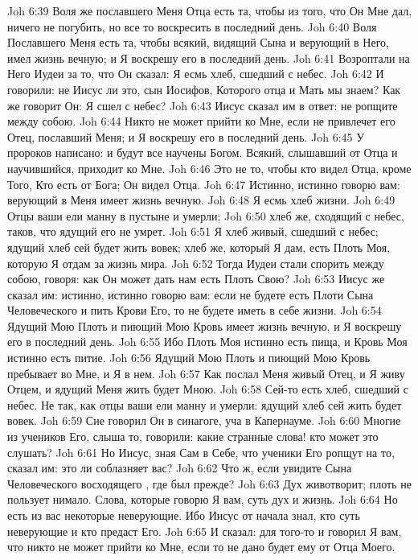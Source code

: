 \vs Joh 6:39 Воля же пославшего Меня Отца есть та, чтобы из того, что Он Мне дал, ничего не погубить, но все то воскресить в последний день.
\vs Joh 6:40 Воля Пославшего Меня есть та, чтобы всякий, видящий Сына и верующий в Него, имел жизнь вечную; и Я воскрешу его в последний день.
\vs Joh 6:41 Возроптали на Него Иудеи за то, что Он сказал: Я есмь хлеб, сшедший с небес.
\vs Joh 6:42 И говорили: не Иисус ли это, сын Иосифов, Которого отца и Мать мы знаем? Как же говорит Он: Я сшел с небес?
\vs Joh 6:43 Иисус сказал им в ответ: не ропщите между собою.
\vs Joh 6:44 Никто не может прийти ко Мне, если не привлечет его Отец, пославший Меня; и Я воскрешу его в последний день.
\vs Joh 6:45 У пророков написано: и будут все научены Богом. Всякий, слышавший от Отца и научившийся, приходит ко Мне.
\vs Joh 6:46 Это не то, чтобы кто видел Отца, кроме Того, Кто есть от Бога; Он видел Отца.
\vs Joh 6:47 Истинно, истинно говорю вам: верующий в Меня имеет жизнь вечную.
\vs Joh 6:48 Я есмь хлеб жизни.
\vs Joh 6:49 Отцы ваши ели манну в пустыне и умерли;
\vs Joh 6:50 хлеб же, сходящий с небес, таков, что ядущий его не умрет.
\vs Joh 6:51 Я хлеб живый, сшедший с небес; ядущий хлеб сей будет жить вовек; хлеб же, который Я дам, есть Плоть Моя, которую Я отдам за жизнь мира.
\vs Joh 6:52 Тогда Иудеи стали спорить между собою, говоря: как Он может дать нам есть Плоть Свою?
\vs Joh 6:53 Иисус же сказал им: истинно, истинно говорю вам: если не будете есть Плоти Сына Человеческого и пить Крови Его, то не будете иметь в себе жизни.
\vs Joh 6:54 Ядущий Мою Плоть и пиющий Мою Кровь имеет жизнь вечную, и Я воскрешу его в последний день.
\vs Joh 6:55 Ибо Плоть Моя истинно есть пища, и Кровь Моя истинно есть питие.
\vs Joh 6:56 Ядущий Мою Плоть и пиющий Мою Кровь пребывает во Мне, и Я в нем.
\vs Joh 6:57 Как послал Меня живый Отец, и Я живу Отцем,  и ядущий Меня жить будет Мною.
\vs Joh 6:58 Сей-то есть хлеб, сшедший с небес. Не так, как отцы ваши ели манну и умерли: ядущий хлеб сей жить будет вовек.
\vs Joh 6:59 Сие говорил Он в синагоге, уча в Капернауме.
\vs Joh 6:60 Многие из учеников Его, слыша то, говорили: какие странные слова! кто может это слушать?
\vs Joh 6:61 Но Иисус, зная Сам в Себе, что ученики Его ропщут на то, сказал им: это ли соблазняет вас?
\vs Joh 6:62 Что ж, если увидите Сына Человеческого восходящего , где был прежде?
\vs Joh 6:63 Дух животворит; плоть не пользует нимало. Слова, которые говорю Я вам, суть дух и жизнь.
\vs Joh 6:64 Но есть из вас некоторые неверующие. Ибо Иисус от начала знал, кто суть неверующие и кто предаст Его.
\vs Joh 6:65 И сказал: для того-то и говорил Я вам, что никто не может прийти ко Мне, если то не дано будет ему от Отца Моего.
